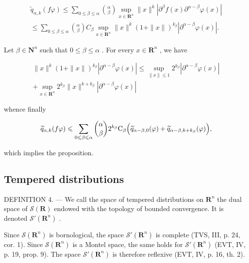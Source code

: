 \[
\begin{array}{l} \widetilde {q} _ {\alpha , k} (f \varphi) \leqslant \sum_ {0 \leqslant \beta \leqslant \alpha} \binom {\alpha} {\beta} \sup _ {x \in \mathbf {R} ^ {n}} \| x \| ^ {k} | \partial^ {\beta} f (x)   \partial^ {\alpha - \beta} \varphi (x) | \\ \leqslant \sum_ {0 \leqslant \beta \leqslant \alpha} \binom {\alpha} {\beta} C _ {\beta} \sup _ {x \in \mathbf {R} ^ {n}} \| x \| ^ {k} (1 + \| x \|) ^ {k _ {\beta}} | \partial^ {\alpha - \beta} \varphi (x) |. \end{array}
\]

Let \(\beta \in \mathbf{N}^n\) such that \(0 \leqslant \beta \leqslant \alpha\) . For every \(x \in \mathbf{R}^n\) , we have

\[
\begin{array}{c} \| x \| ^ {k} (1 + \| x \|) ^ {k _ {\beta}} | \partial^ {\alpha - \beta} \varphi (x) | \leqslant \sup _ {\| x \| \leqslant 1} 2 ^ {k _ {\beta}} | \partial^ {\alpha - \beta} \varphi (x) | \\ + \sup _ {x \in \mathbf {R} ^ {n}} 2 ^ {k _ {\beta}} \| x \| ^ {k + k _ {\beta}} | \partial^ {\alpha - \beta} \varphi (x) | \end{array}
\]

whence finally

\[
\widetilde {q} _ {\alpha , k} (f \varphi) \leqslant \sum_ {0 \leqslant \beta \leqslant \alpha} \binom {\alpha} {\beta} 2 ^ {k _ {\beta}} \mathrm{C} _ {\beta} \Bigl (\widetilde {q} _ {\alpha - \beta , 0} (\varphi) + \widetilde {q} _ {\alpha - \beta , k + k _ {\beta}} (\varphi) \Bigr),
\]

which implies the proposition.

\subsection{Tempered distributions}

DEFINITION 4. --- We call the space of tempered distributions on \(\mathbf{R}^{n}\) the dual space of \(\mathcal{S}(\mathbf{R})\) endowed with the topology of bounded convergence. It is denoted \(\mathcal{S}'(\mathbf{R}^{n})\) .

Since \(\mathcal{S}(\mathbf{R}^n)\) is bornological, the space \(\mathcal{S}'(\mathbf{R}^n)\) is complete (TVS, III, p. 24, cor. 1). Since \(\mathcal{S}(\mathbf{R}^n)\) is a Montel space, the same holds for \(\mathcal{S}'(\mathbf{R}^n)\) (EVT, IV, p. 19, prop. 9). The space \(\mathcal{S}'(\mathbf{R}^n)\) is therefore reflexive (EVT, IV, p. 16, th. 2).

